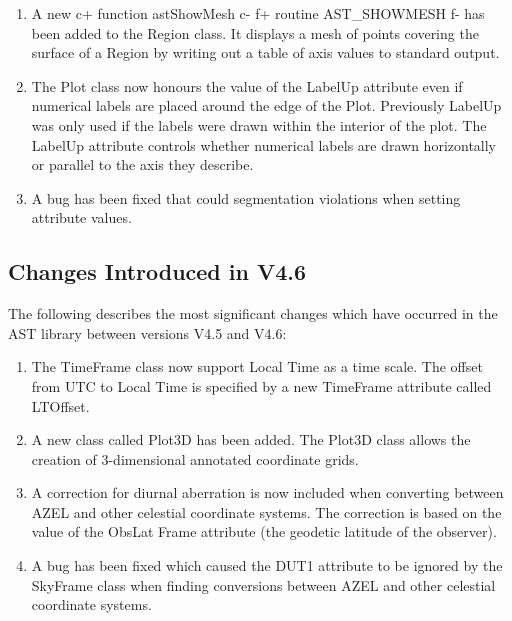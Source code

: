 \documentclass[twoside,11pt]{starlink}
\begin{document}
\begin{enumerate}
\item A new
c+
function astShowMesh
c-
f+
routine AST\_SHOWMESH
f-
has been added to the Region class. It displays a mesh of points covering
the surface of a Region by writing out a table of axis values to standard
output.

\item The Plot class now honours the value of the LabelUp attribute even if
numerical labels are placed around the edge of the Plot. Previously
LabelUp was only used if the labels were drawn within the interior of
the plot. The LabelUp attribute controls whether numerical labels are
drawn horizontally or parallel to the axis they describe.

\item A bug has been fixed that could segmentation violations when setting
attribute values.

\end{enumerate}

\subsection{Changes Introduced in V4.6}

The following describes the most significant changes which have
occurred in the AST library between versions V4.5 and V4.6:

\begin{enumerate}

\item The TimeFrame class now support Local Time as a time scale. The offset
from UTC to Local Time is specified by a new TimeFrame attribute called
LTOffset.

\item A new class called Plot3D has been added. The Plot3D class allows
the creation of 3-dimensional annotated coordinate grids.

\item A correction for diurnal aberration is now included when
converting between AZEL and other celestial coordinate systems. The
correction is based on the value of the ObsLat Frame attribute (the
geodetic latitude of the observer).

\item A bug has been fixed which caused the DUT1 attribute to be ignored
by the SkyFrame class when finding conversions between AZEL and other
celestial coordinate systems.

\end{enumerate}
\end{document}
